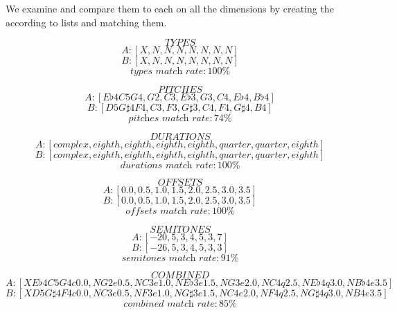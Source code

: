 \documentclass[a4paper]{article}
\begin{document}
We examine and compare them to each on all the dimensions by creating the according to lists and matching them.

\[\textit{TYPES}\]
\[A: [X, N, N, N, N, N, N, N] \]
\[B: [X, N, N, N, N, N, N, N] \]
\[\textit{types match rate}: 100\% \]


\[\textit{PITCHES}\]
\[A: [E\flat4C5G4, G2, C3, E\flat3, G3, C4, E\flat4, B\flat4] \]
\[B: [D5G\sharp4F4, C3, F3, G\sharp3, C4, F4, G\sharp4, B4] \]
\[\textit{pitches match rate}: 74\% \]


\[\textit{DURATIONS}\]
\[A: [complex, eighth, eighth, eighth, eighth, quarter, quarter, eighth] \]
\[B: [complex, eighth, eighth, eighth, eighth, quarter, quarter, eighth] \]
\[\textit{durations match rate}: 100\% \]


\[\textit{OFFSETS}\]
\[A: [0.0, 0.5, 1.0, 1.5, 2.0, 2.5, 3.0, 3.5]\]
\[ B: [0.0, 0.5, 1.0, 1.5, 2.0, 2.5, 3.0, 3.5] \]
\[\textit{offsets match rate}: 100\% \]


\[\textit{SEMITONES}\]
\[ A: [-20, 5, 3, 4, 5, 3, 7] \]
\[ B: [-26, 5, 3, 4, 5, 3, 3]\]
\[\textit{semitones match rate}: 91\% \]


\[\textit{COMBINED}\]
\[ A: [XE\flat4C5G4c0.0, NG2e0.5, NC3e1.0, NE\flat3e1.5, NG3e2.0, NC4q2.5, NE\flat4q3.0, NB\flat4e3.5]\]
\[ B: [XD5G\sharp4F4c0.0, NC3e0.5, NF3e1.0, NG\sharp3e1.5, NC4e2.0, NF4q2.5, NG\sharp4q3.0, NB4e3.5]\]
\[\textit{combined match rate}: 85\% \]
\end{document}
